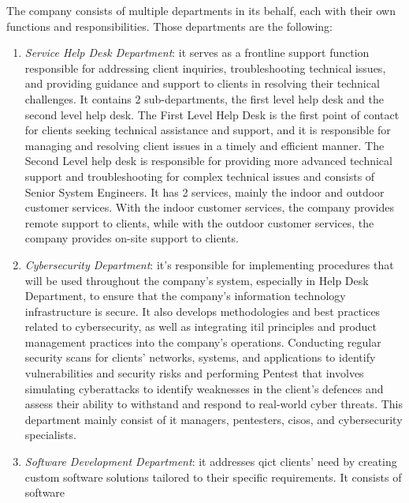 The company consists of multiple departments in its behalf, each with their own functions and responsibilities.
Those departments are the following:
\begin{enumerate}
      \item \textit{Service Help Desk Department}: it serves as a frontline support function responsible for
            addressing client inquiries, troubleshooting technical issues, and providing guidance and support
            to clients in resolving their technical challenges. It contains 2 sub-departments, the first level
            help desk and the second level help desk. The First Level Help Desk is the first point of contact
            for clients seeking technical assistance and support, and it is responsible for managing and
            resolving client issues in a timely and efficient manner. The Second Level help desk is
            responsible for providing more advanced technical support and troubleshooting for complex
            technical issues and consists of Senior System Engineers. It has 2 services, mainly the indoor
            and outdoor customer services. With the indoor customer services, the company provides remote
            support to clients, while with the outdoor customer services, the company provides on-site
            support to clients.
      \item \textit{Cybersecurity Department}: it's responsible for implementing procedures that will be used
            throughout the company's system, especially in Help Desk Department, to ensure that the company's
            information technology infrastructure is secure. It also develops methodologies and best practices
            related to cybersecurity, as well as integrating \acrshort{itil} principles and product management
            practices into the company's operations. Conducting regular security scans for clients' networks,
            systems, and applications to identify vulnerabilities and security risks and performing
            \gls{Pentest} that involves simulating cyberattacks to identify weaknesses in the client's
            defences and assess their ability to withstand and respond to real-world cyber threats. This
            department mainly consist of \acrshort{it} managers, \acrshort{pentest}ers, \acrshort{ciso}s,
            and cybersecurity specialists.
      \item \textit{Software Development Department}: it addresses \acrshort{qict} clients' need by creating
            custom software solutions tailored to their specific requirements. It consists of software

\end{enumerate}
